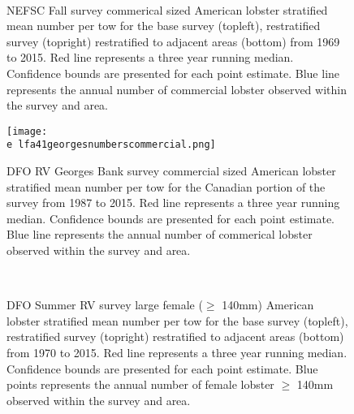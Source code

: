 \documentclass[11pt]{article}
\newcommand{\e}{/backup/bio_data/bio.lobster/figures/} %
\begin{document}
\begin{figure}
\centering
{}
\\
\caption{NEFSC Fall survey commerical sized American lobster stratified mean number per tow for the base survey (topleft), restratified survey (topright) restratified to adjacent areas (bottom) from 1969 to 2015. Red line represents a three year running median. Confidence bounds are presented for each point estimate. Blue line represents the annual number of commercial lobster observed within the survey and area.}
\end{figure}
\clearpage

\begin{figure}

    \texttt{[image: \\e lfa41georgesnumberscommercial.png]}
    \caption{DFO RV Georges Bank survey commercial sized American lobster stratified mean number per tow for the Canadian portion of the survey from 1987 to 2015. Red line represents a three year running median. Confidence bounds are presented for each point estimate. Blue line represents the annual number of commerical lobster observed within the survey and area.}

\end{figure}



\begin{figure}
\centering
{}
\\
\caption{DFO Summer RV survey large female ($\geq$ 140mm) American lobster stratified mean number per tow for the base survey (topleft), restratified survey (topright) restratified to adjacent areas (bottom) from 1970 to 2015. Red line represents a three year running median. Confidence bounds are presented for each point estimate. Blue points represents the annual number of female lobster $\geq$ 140mm observed within the survey and area.}
\end{figure}
\clearpage
\end{document}
